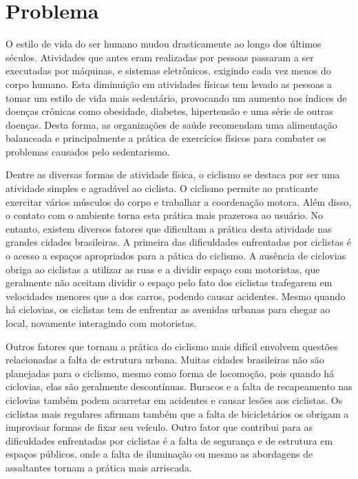 \chapter*[Problema]{Problema}

O estilo de vida do ser humano mudou drasticamente ao longo dos últimos séculos. Atividades que antes eram realizadas por pessoas passaram a ser executadas por máquinas, e sistemas eletrônicos, exigindo cada vez menos do corpo humano. Esta diminuição em atividades físicas tem levado as pessoas a tomar um estilo de vida mais sedentário, provocando um aumento nos índices de doenças crônicas como obesidade, diabetes, hipertensão e uma série de outras doenças. Desta forma, as organizações de saúde recomendam uma alimentação balanceada e principalmente a prática de exercícios físicos para combater os problemas causados pelo sedentarismo.

Dentre as diversas formas de atividade física, o ciclismo se destaca por ser uma atividade simples e agradável ao ciclista. O ciclismo permite ao praticante exercitar vários músculos do corpo e trabalhar a coordenação motora. Além disso, o contato com o ambiente torna esta prática mais prazerosa ao usuário. No entanto, existem diversos fatores que dificultam a prática desta atividade nas grandes cidades brasileiras.
A primeira das dificuldades enfrentadas por ciclistas é o acesso a espaços apropriados para a pática do ciclismo. A ausência de ciclovias obriga ao ciclistas a utilizar as ruas e a dividir espaço com motoristas, que geralmente não aceitam dividir o espaço pelo fato dos ciclistas trafegarem em velocidades menores que a dos carros, podendo causar acidentes. Mesmo quando há ciclovias, os ciclistas tem de enfrentar as avenidas urbanas para chegar ao local, novamente interagindo com motoristas.

Outros fatores que tornam a prática do ciclismo mais difícil envolvem questões relacionadas a falta de estrutura urbana. Muitas cidades brasileiras não são planejadas para o ciclismo, mesmo como forma de locomoção, pois quando há ciclovias, elas são geralmente descontínuas. Buracos e a falta de recapeamento nas ciclovias também podem acarretar em acidentes e causar lesões aos ciclistas. Os ciclistas mais regulares afirmam também que a falta de bicicletários os obrigam a improvisar formas de fixar seu veículo. Outro fator que contribui para as dificuldades enfrentadas por ciclistas é a falta de segurança e de estrutura em espaços públicos, onde a falta de iluminação ou mesmo as abordagens de assaltantes tornam a prática mais arriscada.


